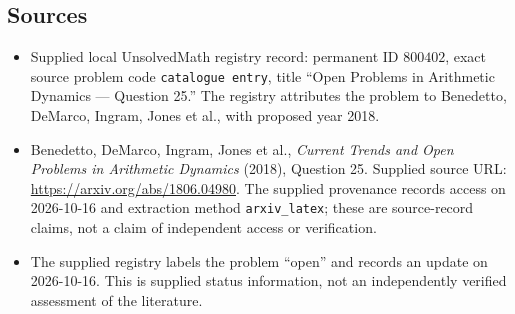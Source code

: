 \documentclass[11pt]{article}
\begin{document}
\subsection{Sources}
\begin{itemize}
\item Supplied local UnsolvedMath registry record: permanent ID \(800402\), exact source problem code \texttt{catalogue entry}, title ``Open Problems in Arithmetic Dynamics --- Question 25.'' The registry attributes the problem to Benedetto, DeMarco, Ingram, Jones et al., with proposed year 2018.
\item Benedetto, DeMarco, Ingram, Jones et al., \emph{Current Trends and Open Problems in Arithmetic Dynamics} (2018), Question 25. Supplied source URL: \url{https://arxiv.org/abs/1806.04980}. The supplied provenance records access on 2026-10-16 and extraction method \texttt{arxiv\_latex}; these are source-record claims, not a claim of independent access or verification.
\item The supplied registry labels the problem ``open'' and records an update on 2026-10-16. This is supplied status information, not an independently verified assessment of the literature.
\end{itemize}
\end{document}
